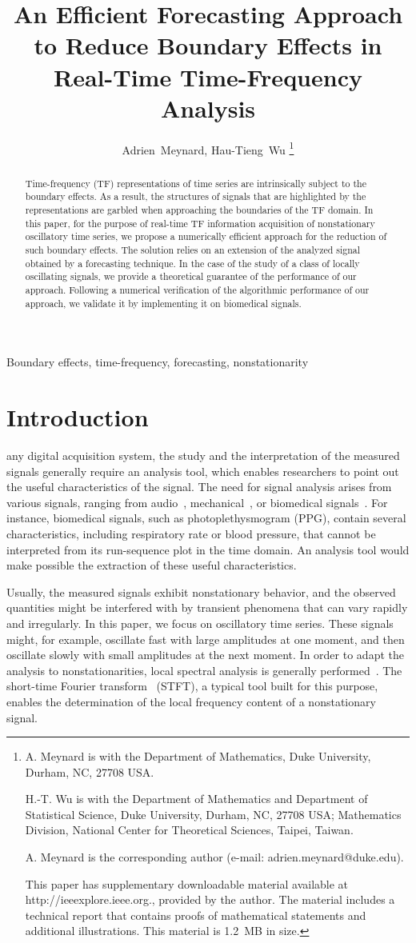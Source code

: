 \documentclass[journal]{IEEEtran}
\title{An Efficient Forecasting Approach\\ to Reduce Boundary Effects in Real-Time Time-Frequency Analysis}
\author{Adrien~Meynard, %
        Hau-Tieng~Wu
\thanks{A. Meynard is with the Department
of Mathematics, Duke University, Durham,
NC, 27708 USA.

H.-T. Wu is with the Department of Mathematics and Department of Statistical Science, Duke University, Durham, NC, 27708 USA; Mathematics Division, National Center for Theoretical Sciences, Taipei, Taiwan.
 
A. Meynard is the corresponding author (e-mail: adrien.meynard@duke.edu).

This paper has supplementary downloadable material available at http://ieeexplore.ieee.org., provided by the author. The material includes a technical report that contains proofs of mathematical statements
and additional illustrations. This material is 1.2~MB in size.
}}
\begin{document}
\maketitle

\begin{abstract}
Time-frequency (TF) representations of time series are intrinsically subject to the boundary effects. As a result, the structures of signals that are highlighted by the representations are garbled when approaching the boundaries of the TF domain. In this paper, for the purpose of real-time TF information acquisition of nonstationary oscillatory time series, we propose a numerically efficient approach for the reduction of such boundary effects. The solution relies on an extension of the analyzed signal obtained by a forecasting technique. In the case of the study of a class of locally oscillating signals, we provide a theoretical guarantee of the performance of our approach. Following a numerical verification of the algorithmic performance of our approach, we validate it by implementing it on biomedical signals.
\end{abstract}

\begin{IEEEkeywords}
Boundary effects, time-frequency, forecasting, nonstationarity
\end{IEEEkeywords}

\section{Introduction}
\label{se:introduction}
 any digital acquisition system, the study and the interpretation of the measured signals generally require an analysis tool, which enables researchers to point out the useful characteristics of the signal. The need for signal analysis arises from various signals, ranging from audio~\cite{Stowell18computational,Muller11signal}, mechanical~\cite{Peng02vibration}, or biomedical signals~\cite{Akay96detection}. For instance, biomedical signals, such as photoplethysmogram (PPG), contain several characteristics, including respiratory rate or blood pressure, that cannot be interpreted from its run-sequence plot in the time domain. An analysis tool would make possible the extraction of these useful characteristics. 

Usually, the measured signals exhibit nonstationary behavior, and the observed quantities might be interfered with by transient phenomena that can vary rapidly and irregularly. In this paper, we focus on oscillatory time series. These signals might, for example, oscillate fast with large amplitudes at one moment, and then oscillate slowly with small amplitudes at the next moment. In order to adapt the analysis to nonstationarities, local spectral analysis is generally performed~\cite{Stoica05spectral,Matz97generalized}. The short-time Fourier transform~\cite{Grochenig01foundations} (STFT), a typical tool built for this purpose, enables the determination of the local frequency content of a nonstationary signal.
\end{document}
